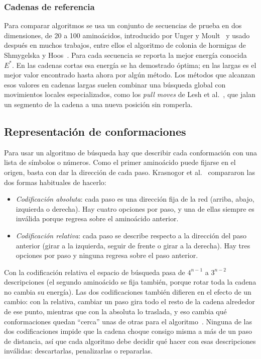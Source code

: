 \subsubsection{Cadenas de referencia}

Para comparar algoritmos se usa un conjunto de secuencias de prueba en dos dimensiones, de 20 a 100 aminoácidos, introducido por Unger y Moult~\cite{unger1993genetic} y usado después en muchos trabajos, entre ellos el algoritmo de colonia de hormigas de Shmygelska y Hoos~\cite{shmygelska2005ant}. Para cada secuencia se reporta la mejor energía conocida $E^*$. En las cadenas cortas esa energía se ha demostrado óptima; en las largas es el mejor valor encontrado hasta ahora por algún método. Los métodos que alcanzan esos valores en cadenas largas suelen combinar una búsqueda global con movimientos locales especializados, como los \textit{pull moves} de Lesh et al.~\cite{lesh2003complete}, que jalan un segmento de la cadena a una nueva posición sin romperla.

\subsection{Representación de conformaciones}
\label{sec:codificaciones}

Para usar un algoritmo de búsqueda hay que describir cada conformación con una lista de símbolos o números. Como el primer aminoácido puede fijarse en el origen, basta con dar la dirección de cada paso. Krasnogor et al.~\cite{krasnogor1999protein} compararon las dos formas habituales de hacerlo:

\begin{itemize}
    \item \textit{Codificación absoluta}: cada paso es una dirección fija de la red (arriba, abajo, izquierda o derecha). Hay cuatro opciones por paso, y una de ellas siempre es inválida porque regresa sobre el aminoácido anterior.
    \item \textit{Codificación relativa}: cada paso se describe respecto a la dirección del paso anterior (girar a la izquierda, seguir de frente o girar a la derecha). Hay tres opciones por paso y ninguna regresa sobre el paso anterior.
\end{itemize}

Con la codificación relativa el espacio de búsqueda pasa de $4^{n-1}$ a $3^{n-2}$ descripciones (el segundo aminoácido se fija también, porque rotar toda la cadena no cambia su energía). Las dos codificaciones también difieren en el efecto de un cambio: con la relativa, cambiar un paso gira todo el resto de la cadena alrededor de ese punto, mientras que con la absoluta lo traslada, y eso cambia qué conformaciones quedan ``cerca'' unas de otras para el algoritmo~\cite{krasnogor1999protein}. Ninguna de las dos codificaciones impide que la cadena choque consigo misma a más de un paso de distancia, así que cada algoritmo debe decidir qué hacer con esas descripciones inválidas: descartarlas, penalizarlas o repararlas.

